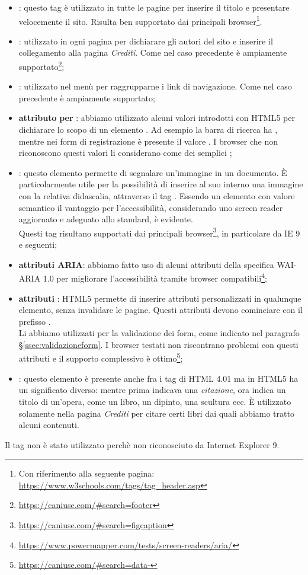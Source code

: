 \documentclass[12pt]{article}
\begin{document}
	\begin{itemize}
		\item {}: questo tag è utilizzato in tutte le pagine per inserire il titolo e presentare velocemente il sito. Risulta ben supportato dai principali browser\footnote{Con riferimento alla seguente pagina: \url{https://www.w3schools.com/tags/tag_header.asp}}.
		\item {}: utilizzato in ogni pagina per dichiarare gli autori del sito e inserire il collegamento alla pagina \textit{Crediti}. Come nel caso precedente è ampiamente supportato\footnote{\url{https://caniuse.com/\#search=footer}};
		\item {}: utilizzato nel menù per raggrupparne i link di navigazione. Come nel caso precedente è ampiamente supportato;
		\item \textbf{attributo}  \textbf{per} : abbiamo utilizzato alcuni valori introdotti con HTML5 per dichiarare lo scopo di un elemento . Ad esempio la barra di ricerca ha , mentre nei form di registrazione è presente il valore . I browser che non riconoscono questi valori li considerano come dei semplici ;
		\item {}: questo elemento permette di segnalare un'immagine in un documento. È particolarmente utile per la possibilità di inserire al suo interno una immagine con la relativa didascalia, attraverso il tag . Essendo un elemento con valore semantico il vantaggio per l'accessibilità, considerando uno screen reader aggiornato e adeguato allo standard, è evidente.\\ Questi tag risultano supportati dai principali browser\footnote{\url{https://caniuse.com/\#search=figcaption}}, in particolare da IE 9 e seguenti;
		\item \textbf{attributi ARIA}: abbiamo fatto uso di alcuni attributi della specifica WAI-ARIA 1.0 per migliorare l'accessibilità tramite browser compatibili\footnote{\url{https://www.powermapper.com/tests/screen-readers/aria/}};
		\item \textbf{attributi} : HTML5 permette di inserire attributi personalizzati in qualunque elemento, senza invalidare le pagine. Questi attributi devono cominciare con il prefisso .\\Li abbiamo utilizzati per la validazione dei form, come indicato nel paragrafo §\ref{ssec:validazioneform}. I browser testati non riscontrano problemi con questi attributi e il supporto complessivo è ottimo\footnote{\url{https://caniuse.com/\#search=data-}};
		\item {}: questo elemento è presente anche fra i tag di HTML 4.01 ma in HTML5 ha un significato diverso: mentre prima indicava una \textit{citazione}, ora indica un titolo di un'opera, come un libro, un dipinto, una scultura ecc. È utilizzato solamente nella pagina \textit{Crediti} per citare certi libri dai quali abbiamo tratto alcuni contenuti.
	\end{itemize}
	Il tag  non è stato utilizzato perchè non riconosciuto da Internet Explorer 9.
	
\end{document}
